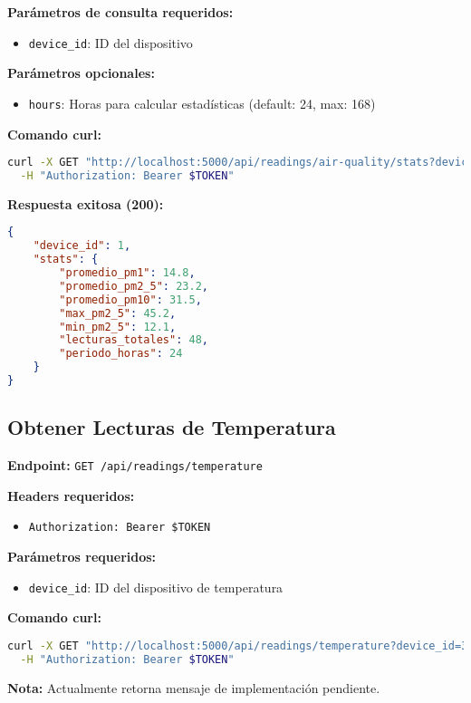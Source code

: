 \documentclass[12pt,a4paper]{article}
\begin{document}
\textbf{Parámetros de consulta requeridos:}
\begin{itemize}
\item \texttt{device\_id}: ID del dispositivo
\end{itemize}

\textbf{Parámetros opcionales:}
\begin{itemize}
\item \texttt{hours}: Horas para calcular estadísticas (default: 24, max: 168)
\end{itemize}

\textbf{Comando curl:}
\begin{lstlisting}[language=bash]
curl -X GET "http://localhost:5000/api/readings/air-quality/stats?device_id=1&hours=24" \
  -H "Authorization: Bearer $TOKEN"
\end{lstlisting}

\textbf{Respuesta exitosa (200):}
\begin{lstlisting}[language=JSON]
{
    "device_id": 1,
    "stats": {
        "promedio_pm1": 14.8,
        "promedio_pm2_5": 23.2,
        "promedio_pm10": 31.5,
        "max_pm2_5": 45.2,
        "min_pm2_5": 12.1,
        "lecturas_totales": 48,
        "periodo_horas": 24
    }
}
\end{lstlisting}

\subsection{Obtener Lecturas de Temperatura}

\textbf{Endpoint:} \texttt{GET /api/readings/temperature}

\textbf{Headers requeridos:}
\begin{itemize}
\item \texttt{Authorization: Bearer \$TOKEN}
\end{itemize}

\textbf{Parámetros requeridos:}
\begin{itemize}
\item \texttt{device\_id}: ID del dispositivo de temperatura
\end{itemize}

\textbf{Comando curl:}
\begin{lstlisting}[language=bash]
curl -X GET "http://localhost:5000/api/readings/temperature?device_id=3" \
  -H "Authorization: Bearer $TOKEN"
\end{lstlisting}

\textbf{Nota:} Actualmente retorna mensaje de implementación pendiente.
\end{document}
